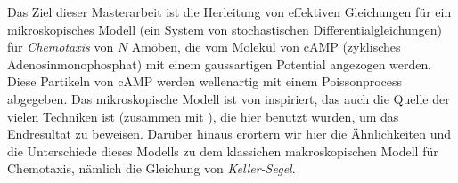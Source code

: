 Das Ziel dieser Masterarbeit ist die Herleitung von effektiven Gleichungen für ein mikroskopisches Modell (ein System von stochastischen Differentialgleichungen) für \emph{Chemotaxis} von $N$ Amöben, die vom Molekül von cAMP (zyklisches Adenosinmonophosphat) mit einem gaussartigen Potential angezogen werden.
Diese Partikeln von cAMP werden wellenartig mit einem Poissonprocess abgegeben.
Das mikroskopische Modell ist von \cite{ana} inspiriert, das auch die Quelle der vielen Techniken ist (zusammen mit \cite{peter-boers}), die hier benutzt wurden, um das Endresultat zu beweisen.
Darüber hinaus erörtern wir hier die Ähnlichkeiten und die Unterschiede dieses Modells zu dem klassichen makroskopischen Modell für Chemotaxis, nämlich die Gleichung von \emph{Keller-Segel}.